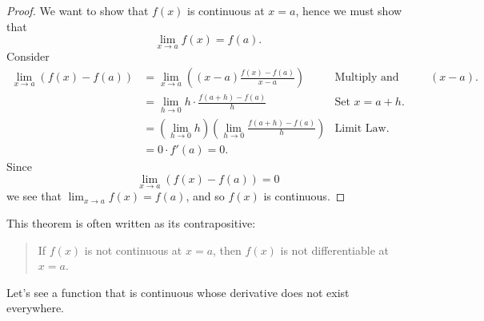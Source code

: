 \begin{proof}
We want to show that $f(x)$ is continuous at $x=a$, hence we must show that 
\[
\lim_{x\to a} f(x) = f(a).
\]
Consider
\begin{align*}
\lim_{x\to a} \left(f(x) - f(a)\right) &= \lim_{x\to a} \left((x-a)\frac{f(x) - f(a)}{x-a}\right) &\text{Multiply and divide by $(x-a)$.} \\
&= \lim_{h\to 0} h \cdot \frac{f(a+h) - f(a)}{h} &\text{Set $x = a+h$.} \\
&= \left(\lim_{h\to 0} h\right) \left(\lim_{h\to 0}\frac{f(a+h) - f(a)}{h}\right) &\text{Limit Law.} \\
&= 0\cdot f'(a) = 0.
\end{align*}
Since 
\[
\lim_{x\to a}\left(f(x) - f(a)\right) = 0 
\]
we see that $\lim_{x\to a} f(x) = f(a)$, and so $f(x)$ is continuous.
\end{proof}

This theorem is often written as its contrapositive:
\begin{quote}
If $f(x)$ is not continuous at $x=a$, then $f(x)$ is not
differentiable at $x=a$.
\end{quote}


Let's see a function that is continuous whose derivative does not
exist everywhere.


